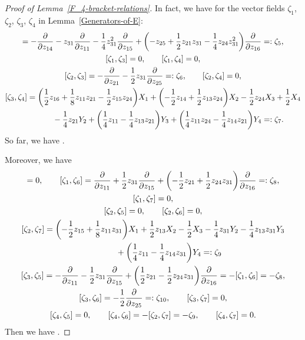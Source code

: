 \documentclass[11pt]{article}
\numberwithin{equation}{section}
\numberwithin{equation}{section}
\theoremstyle{definition}
\newcommand{\0}{\boldsymbol{0}}
\newcommand{\pa}{\partial}
\newcommand{\rank}{\operatorname{rank}}
\begin{document}
\begin{proof}[Proof of Lemma~\ref{F_4-bracket-relations}]
In fact, we have for the vector fields $\zeta_1$, $\zeta_2$, $\zeta_3$, $\zeta_4$ in Lemma~\ref{Generators-of-E}:
\begin{gather*}
[\zeta_1, \zeta_2] = - \frac{\pa}{\pa z_{14}} - z_{31}\frac{\pa}{\pa z_{11}} - \frac{1}{4}z_{31}^2\frac{\pa}{\pa z_{15}}
+ \biggl(
- z_{25} + \frac{1}{2}z_{21}z_{31} - \frac{1}{4}z_{24}z_{31}^2\biggr)\frac{\pa}{\pa z_{16}} =: \zeta_5,
\\
[\zeta_1, \zeta_3] = 0,\qquad [\zeta_1, \zeta_4] = 0,
\\
[\zeta_2, \zeta_3] = - \frac{\pa}{\pa z_{21}} - \frac{1}{2}z_{31}\frac{\pa}{\pa z_{25}} =: \zeta_6,
\qquad
[\zeta_2, \zeta_4] = 0,
\\
[\zeta_3, \zeta_4] = \biggl(\frac{1}{2}z_{16} + \frac{1}{8}z_{11}z_{21} - \frac{1}{2}z_{15}z_{24}\biggr)X_1 +
\biggl(- \frac{1}{2}z_{14} + \frac{1}{2}z_{13}z_{24}\biggr)X_2 - \frac{1}{2}z_{24}X_3 + \frac{1}{2}X_4
\\
\hphantom{[\zeta_3, \zeta_4] =}{}
 - \frac{1}{4}z_{21}Y_2
+ \biggl(\frac{1}{4}z_{11} - \frac{1}{4}z_{13}z_{21}\biggr)Y_3 + \biggl(\frac{1}{4}z_{11}z_{24} - \frac{1}{4}z_{14}z_{21}\biggr)Y_4 =: \zeta_7.
\end{gather*}
So far, we have \smash{$\rank E^{(2)} = 7$}.

Moreover, we have
\begin{gather*}
[\zeta_1, \zeta_5] = 0,
\qquad
[\zeta_1, \zeta_6] = \frac{\pa}{\pa z_{11}} + \frac{1}{2}z_{31}\frac{\pa}{\pa z_{15}}
+ \biggl(-\frac{1}{2}z_{21} + \frac{1}{2}z_{24}z_{31}\biggr)\frac{\pa}{\pa z_{16}} =: \zeta_8,
\\
[\zeta_1, \zeta_7] = 0, \\
[\zeta_2, \zeta_5] = 0, \qquad [\zeta_2, \zeta_6] = 0,
\\
[\zeta_2, \zeta_7] = \biggl(-\frac{1}{2}z_{15} + \frac{1}{8}z_{11}z_{31}\biggr)X_1 +
\frac{1}{2}z_{13}X_2 - \frac{1}{2}X_3
- \frac{1}{4}z_{31}Y_2 - \frac{1}{4}z_{13}z_{31}Y_3
\\
\hphantom{[\zeta_2, \zeta_7] = }{}
+ \biggl(\frac{1}{4}z_{11} - \frac{1}{4}z_{14}z_{31}\biggr)Y_4 =: \zeta_9
\\
[\zeta_3, \zeta_5] = - \frac{\pa}{\pa z_{11}} - \frac{1}{2}z_{31}\frac{\pa}{\pa z_{15}}
+ \biggl(\frac{1}{2}z_{21} - \frac{1}{2}z_{24}z_{31}\biggr)\frac{\pa}{\pa z_{16}} = - [\zeta_1, \zeta_6] = - \zeta_8,
\\
[\zeta_3, \zeta_6] = -\frac{1}{2}\frac{\pa}{\pa z_{25}} =: \zeta_{10}, \qquad [\zeta_3, \zeta_7] = 0,
\\
[\zeta_4, \zeta_5] = 0,
\qquad
[\zeta_4, \zeta_6] = - [\zeta_2, \zeta_7] = - \zeta_9, \qquad [\zeta_4, \zeta_7] = 0.
\end{gather*}
Then we have \smash{$\rank E^{(3)} = 10$}.


\end{proof}
\end{document}
